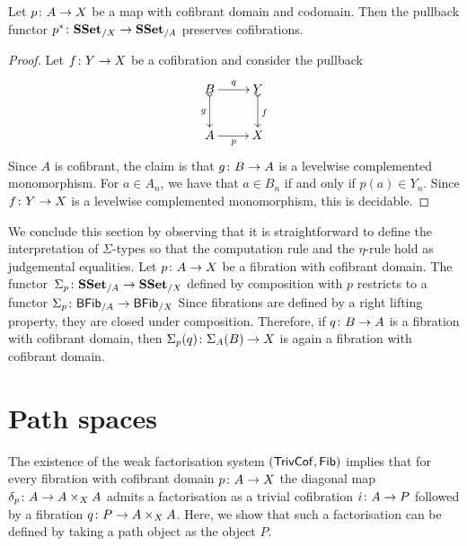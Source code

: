 \documentclass[reqno,10pt,a4paper,oneside,draft]{amsart}
\begin{document}
\begin{proposition} \label{thm:cof-pbk}  Let $p \colon A \to X$  be a map with cofibrant domain and codomain.
Then the pullback functor $p^* \colon \mathbf{SSet}_{/X} \to \mathbf{SSet}_{/A}$ preserves cofibrations. 
\end{proposition}

\begin{proof} Let $f \colon Y \to X$ be a cofibration and consider the pullback
\[
\xymatrix{
B \ar[r]^-{q} \ar@{>->}[d]_-{g} &  Y \ar@{>->}[d]^{f} \\
A \ar[r]_{p} & X}
\]
Since $A$ is cofibrant, the claim is that $g \colon B \rightarrow A$ is a levelwise complemented monomorphism. For $a \in A_n$, we have that $a \in B_n$ if and only if $p(a) \in Y_n$. Since $f \colon Y \rightarrow X$ is a levelwise complemented monomorphism, this is decidable.
\end{proof} 


\begin{remark} 
We conclude this section by observing that it is straightforward to define the interpretation of
$\Sigma$-types so that the computation rule and the $\eta$-rule hold as judgemental equalities. 
Let  $p \colon A \to X$ be a fibration with cofibrant domain. The
functor~$\Sigma_p \colon \mathbf{SSet}_{/A} \to \mathbf{SSet}_{/X}$ defined by
composition with $p$ restricts to a functor
$\Sigma_p \colon \mathsf{BFib}_{/A}  \to \mathsf{BFib}_{/X}$
 Since fibrations are defined by a right lifting property, they are closed
under composition. Therefore, if $q \colon B \to A$ is a fibration with cofibrant domain, then
$\Sigma_p(q) \colon \Sigma_A(B) \to X$ is again a fibration with cofibrant domain.
\end{remark} 



\section{Path spaces}

The existence of the weak factorisation system $(\mathsf{TrivCof}, \mathsf{Fib})$ 
implies that for every fibration with cofibrant domain $p \colon A \to X$ the diagonal map $\delta_p \colon A \to A \times_X A$ admits a factorisation as a trivial cofibration $i \colon A \to P$ followed by a fibration $q \colon P \to A \times_X A$. Here, we show that such a factorisation can be defined by taking a path object as the object $P$. 
\end{document}
